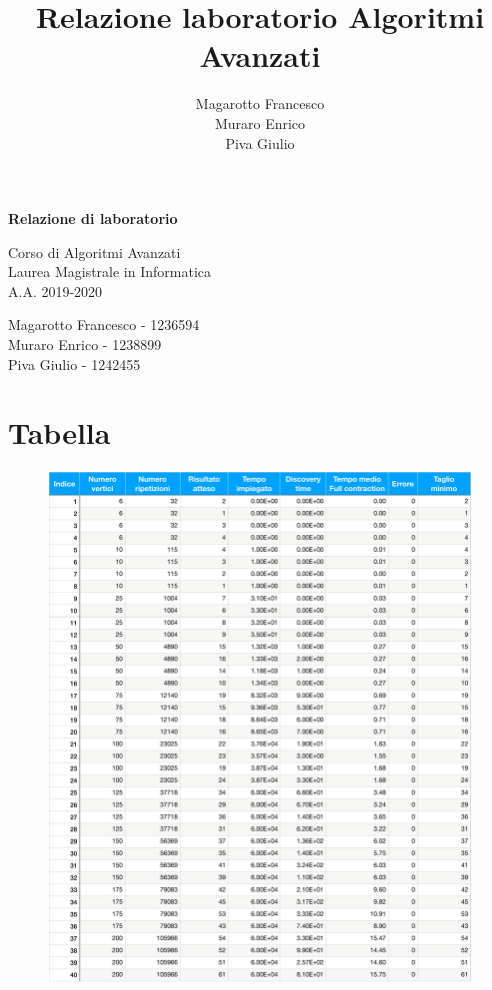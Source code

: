 \documentclass[a4paper]{article}
\title{Relazione laboratorio Algoritmi Avanzati}
\author{Magarotto Francesco\\Muraro Enrico\\Piva Giulio}
\begin{document}
\begin{titlepage}
  \vspace*{5cm}
  \begin{center}
    \Large\bfseries
    Relazione di laboratorio
  \end{center}
  \begin{center}
    \large
    Corso di Algoritmi Avanzati\\
    Laurea Magistrale in Informatica\\A.A. 2019-2020
  \end{center}
  \vspace{4cm plus 1fill}
  \begin{flushleft}
    \large
    Magarotto Francesco - 1236594\\Muraro Enrico - 1238899 \\Piva Giulio - 1242455
  \end{flushleft}
\end{titlepage}
\newpage



\section{Tabella}
\begin{figure}[H]
	\centering
	\includegraphics[width=17cm]{tabellapdf}
	\label{fig:tabellapdf}
\end{figure}
\end{document}
